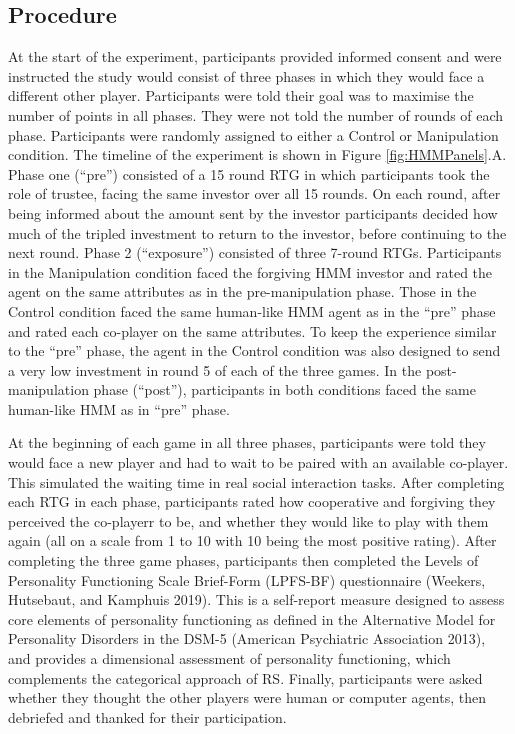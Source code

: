 \documentclass[
]{article}
\begin{document}
\subsection{Procedure}\label{procedure}

At the start of the experiment, participants provided informed consent and were instructed the study would consist of three phases in which they would face a different other player. Participants were told their goal was to maximise the number of points in all phases. They were not told the number of rounds of each phase. Participants were randomly assigned to either a Control or Manipulation condition. The timeline of the experiment is shown in Figure \ref{fig:HMMPanels}.A. Phase one (``pre'') consisted of a 15 round RTG in which participants took the role of trustee, facing the same investor over all 15 rounds. On each round, after being informed about the amount sent by the investor participants decided how much of the tripled investment to return to the investor, before continuing to the next round. Phase 2 (``exposure'') consisted of three 7-round RTGs. Participants in the Manipulation condition faced the forgiving HMM investor and rated the agent on the same attributes as in the pre-manipulation phase. Those in the Control condition faced the same human-like HMM agent as in the ``pre'' phase and rated each co-player on the same attributes. To keep the experience similar to the ``pre'' phase, the agent in the Control condition was also designed to send a very low investment in round 5 of each of the three games. In the post-manipulation phase (``post''), participants in both conditions faced the same human-like HMM as in ``pre'' phase.

At the beginning of each game in all three phases, participants were told they would face a new player and had to wait to be paired with an available co-player. This simulated the waiting time in real social interaction tasks. After completing each RTG in each phase, participants rated how cooperative and forgiving they perceived the co-playerr to be, and whether they would like to play with them again (all on a scale from 1 to 10 with 10 being the most positive rating). After completing the three game phases, participants then completed the Levels of Personality Functioning Scale Brief-Form (LPFS-BF) questionnaire (Weekers, Hutsebaut, and Kamphuis 2019). This is a self-report measure designed to assess core elements of personality functioning as defined in the Alternative Model for Personality Disorders in the DSM-5 (American Psychiatric Association 2013), and provides a dimensional assessment of personality functioning, which complements the categorical approach of RS. Finally, participants were asked whether they thought the other players were human or computer agents, then debriefed and thanked for their participation.
\end{document}
